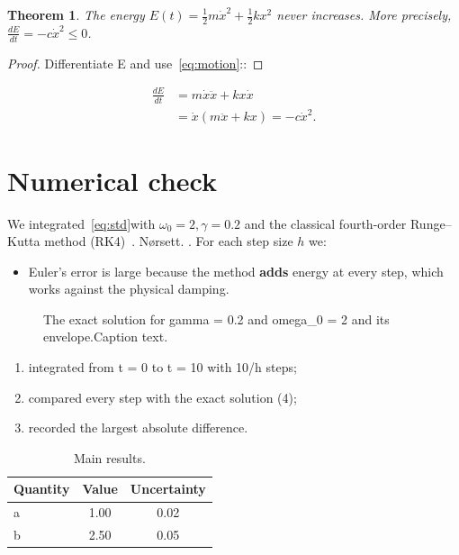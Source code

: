 \documentclass[11pt,a4paper]{article}
\newtheorem{theorem}{Theorem}
\begin{document}
\begin{theorem}
  The energy $E(t)=\frac{1}{2}m\dot{x}^{2}+\frac{1}{2}kx^{2}$ never increases. More precisely, $\frac{dE}{dt}=-c\dot{x}^{2}\leq0$.
\end{theorem}

\begin{proof}
  Differentiate E and use~\eqref{eq:motion}::
\end{proof}

\begin{align}
  \frac{dE}{dt} &=m\dot{x}\ddot{x}+kx\dot{x} \\
   &=\dot{x}(m\ddot{x}+kx)=-c\dot{x}^{2}.
\end{align}

\section{Numerical check}\label{sec:results}

We integrated~\eqref{eq:std}with $\omega_{0}=2,\gamma=0.2$ and the classical fourth-order Runge--Kutta method (RK4)~\cite{ref2}. Nørsett. . For each step size $h$ we:

\begin{itemize}
  \item Euler's error is large because the method \textbf{adds} energy at every step, which works against the physical damping.
\end{itemize}

\begin{figure}[htbp]
  \centering
  \caption{The exact solution for gamma = 0.2 and omega\_0 = 2 and its envelope.Caption text.}
\end{figure}

\begin{enumerate}
  \item integrated from t = 0 to t = 10 with 10/h steps;
  \item compared every step with the exact solution (4);
  \item recorded the largest absolute difference.
\end{enumerate}

\begin{table}[htbp]
  \centering
  \caption{Main results.}
  \label{tab:results}
  \begin{tabular}{lcc}
    \toprule
    \textbf{Quantity} & \textbf{Value} & \textbf{Uncertainty} \\
    \midrule
    a & 1.00 & 0.02 \\
    b & 2.50 & 0.05 \\
    \bottomrule
  \end{tabular}
\end{table}
\end{document}
